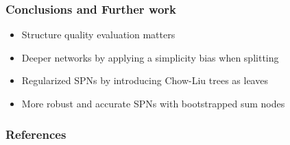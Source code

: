 \documentclass[xcolor={usenames,dvipsnames,svgnames}, compress]{beamer}
\begin{document}
\begin{frame}
  \frametitle{Conclusions and Further work}
  \begin{itemize}
  \item Structure quality evaluation matters
  \item Deeper networks by applying a simplicity bias when splitting
  \item Regularized SPNs by introducing Chow-Liu trees as leaves
    \item More robust and accurate SPNs with bootstrapped sum nodes
  \end{itemize}


  
\end{frame}

\begin{frame}
  \frametitle{References}
  \setlength\bibitemsep{8pt}
  \printbibliography
\end{frame}
\end{document}
